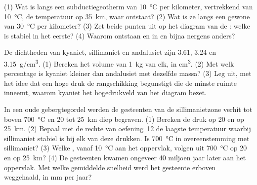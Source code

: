 \begin{exercise}[$\star\star\star$]\label{exo:g12:metamorphic-rocks:13}
(1) Wat is langs een subductiegeotherm van \qty{10}{\celsius} per kilometer, vertrekkend
van \qty{10}{\celsius}, de temperatuur op \qty{35}{km}, waar
 ontstaat? (2) Wat is ze langs een gewone  van
\qty{30}{\celsius} per kilometer? (3) Zet beide punten uit op het diagram van
de : welke  is stabiel in het eerste? (4) Waarom ontstaan
 en  in  en bijna nergens anders?
\end{exercise}

\begin{exercise}[$\star\star\star$]\label{exo:g12:metamorphic-rocks:14}
De dichtheden van kyaniet, sillimaniet en andalusiet zijn \num{3.61},
\num{3.24} en \qty{3.15}{g/cm^3}. (1) Bereken het volume van \qty{1}{kg} van
elk, in \unit{cm^3}. (2) Met welk percentage is kyaniet kleiner dan
andalusiet met dezelfde massa? (3) Leg uit, met het idee dat een hoge druk
de rangschikking begunstigt die de minste ruimte inneemt, waarom kyaniet het
hogedrukveld van het diagram bezet.
\end{exercise}

\begin{exercise}[$\star\star\star$]\label{exo:g12:metamorphic-rocks:15}
In een oude gebergtegordel werden de gesteenten van de sillimanietzone verhit tot boven
\qty{700}{\celsius} en 20 tot \qty{25}{km} diep begraven. (1) Bereken de
druk op 20 en op \qty{25}{km}. (2) Bepaal met de rechte van
oefening~12 de laagste temperatuur waarbij sillimaniet stabiel is bij
elk van deze drukken. Is \qty{700}{\celsius} in overeenstemming met sillimaniet?
(3) Welke , vanaf \qty{10}{\celsius} aan het oppervlak, volgen uit
\qty{700}{\celsius} op 20 en op \qty{25}{km}? (4) De gesteenten kwamen
ongeveer 40 miljoen jaar later aan het oppervlak. Met welke gemiddelde snelheid werd
het gesteente erboven weggehaald, in \unit{mm} per jaar?
\end{exercise}

